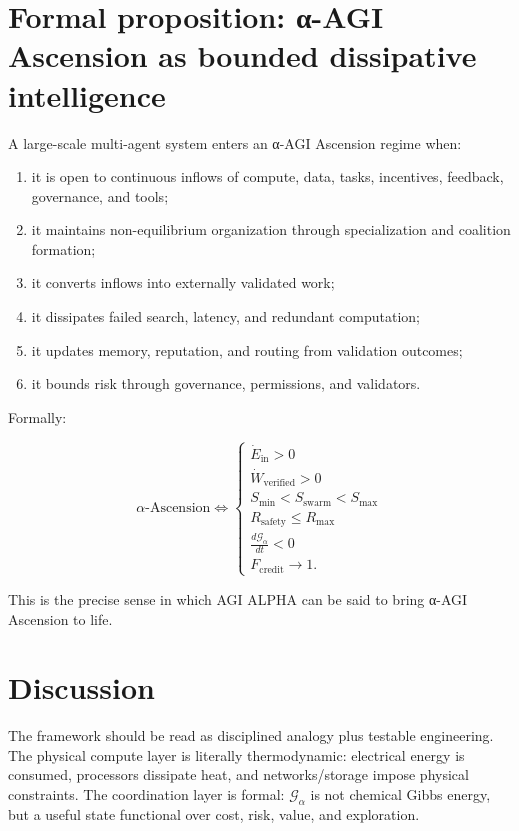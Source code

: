 \documentclass[
  11pt,
]{article}
\providecommand{\tightlist}{%
  \setlength{\itemsep}{0pt}\setlength{\parskip}{0pt}}
\begin{document}
\section{Formal proposition: α-AGI Ascension as bounded dissipative
intelligence}\label{formal-proposition-ux3b1-agi-ascension-as-bounded-dissipative-intelligence}

A large-scale multi-agent system enters an α-AGI Ascension regime when:

\begin{enumerate}
\def\labelenumi{\arabic{enumi}.}
\tightlist
\item
  it is open to continuous inflows of compute, data, tasks, incentives,
  feedback, governance, and tools;
\item
  it maintains non-equilibrium organization through specialization and
  coalition formation;
\item
  it converts inflows into externally validated work;
\item
  it dissipates failed search, latency, and redundant computation;
\item
  it updates memory, reputation, and routing from validation outcomes;
\item
  it bounds risk through governance, permissions, and validators.
\end{enumerate}

Formally:

\[
\alpha\text{-Ascension}
\iff
\begin{cases}
\dot{E}_{\text{in}}>0 \\
\dot{W}_{\text{verified}}>0 \\
S_{\min}<S_{\text{swarm}}<S_{\max} \\
R_{\text{safety}}\leq R_{\max} \\
\frac{d\mathcal{G}_{\alpha}}{dt}<0 \\
F_{\text{credit}}\rightarrow 1.
\end{cases}
\]

This is the precise sense in which AGI ALPHA can be said to bring α-AGI
Ascension to life.

\section{Discussion}\label{discussion}

The framework should be read as disciplined analogy plus testable
engineering. The physical compute layer is literally thermodynamic:
electrical energy is consumed, processors dissipate heat, and
networks/storage impose physical constraints. The coordination layer is
formal: \(\mathcal{G}_{\alpha}\) is not chemical Gibbs energy, but a
useful state functional over cost, risk, value, and exploration.
\end{document}
